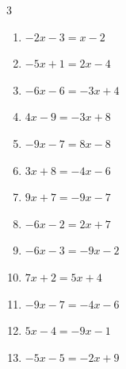 \begin{multicols}{3}
\begin{enumerate}
        \phantom{$\displaystyle x=3$}

  \item $-2x-3=x-2$


  \item $-5x+1=2x-4$


  \item $-6x-6=-3x+4$


  \item $4x-9=-3x+8$


  \item $-9x-7=8x-8$


\columnbreak %

\resetques

  \item $3x+8=-4x-6$

        \phantom{$\displaystyle x=-2$}

  \item $9x+7=-9x-7$


  \item $-6x-2=2x+7$


  \item $-6x-3=-9x-2$


  \item $7x+2=5x+4$

        \phantom{$\displaystyle x=1$}

  \item $-9x-7=-4x-6$


  \item $5x-4=-9x-1$


  \item $-5x-5=-2x+9$



\end{enumerate}
\end{multicols}
